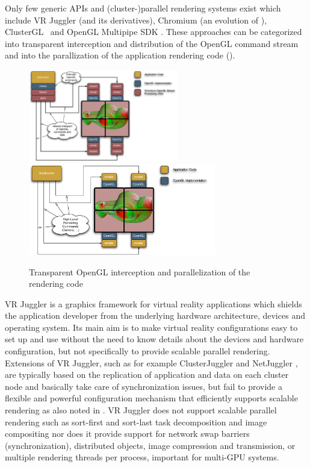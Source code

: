 Only few generic APIs and (cluster-)parallel rendering systems exist which
include VR Juggler \cite{BJHMBC:01} (and its derivatives), Chromium
\cite{HHNFAKK:02} (an evolution of \cite{Humphreys99,Humphreys00,HEBSEH:01}),
{ClusterGL}~\cite{NHM:11} and OpenGL Multipipe SDK
\cite{JDBJBCER:04,BRE:05,MPK}. These approaches can be categorized into
transparent interception and distribution of the OpenGL command stream and into
the parallization of the application rendering code ().

\begin{figure}[ht]
\includegraphics[height=4cm]{images/Chromium}\hfil%
\includegraphics[height=4cm]{images/MPK}%
\caption{Transparent OpenGL interception and parallelization of the rendering code\label{fChromium}}
\end{figure}


VR Juggler \cite{BJHMBC:01,JBBC:98} is a graphics framework for virtual reality
applications which shields the application developer from the underlying
hardware architecture, devices and operating system. Its main aim is to make
virtual reality configurations easy to set up and use without the need to know
details about the devices and hardware configuration, but not specifically to
provide scalable parallel rendering. Extensions of VR Juggler, such as for
example ClusterJuggler \cite{BC:03} and NetJuggler \cite{AGLMR:02}, are
typically based on the replication of application and data on each cluster node
and basically take care of synchronization issues, but fail to provide a
flexible and powerful configuration mechanism that efficiently supports scalable
rendering as also noted in \cite{SWNH:03}. VR Juggler does not support scalable
parallel rendering such as sort-first and sort-last task decomposition and image
compositing nor does it provide support for network swap barriers
(synchronization), distributed objects, image compression and transmission, or
multiple rendering threads per process, important for multi-GPU systems.

